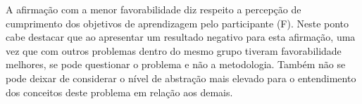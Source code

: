 A afirmação com a menor favorabilidade diz respeito
a percepção de cumprimento dos objetivos de aprendizagem
pelo participante (F).
Neste ponto cabe destacar que ao apresentar um resultado
negativo para esta afirmação, uma vez que com outros
problemas dentro do mesmo grupo tiveram favorabilidade
melhores, se pode questionar o problema e não
a metodologia.
Também não se pode deixar de considerar o nível de abstração
mais elevado para o entendimento dos conceitos deste
problema em relação aos demais.

